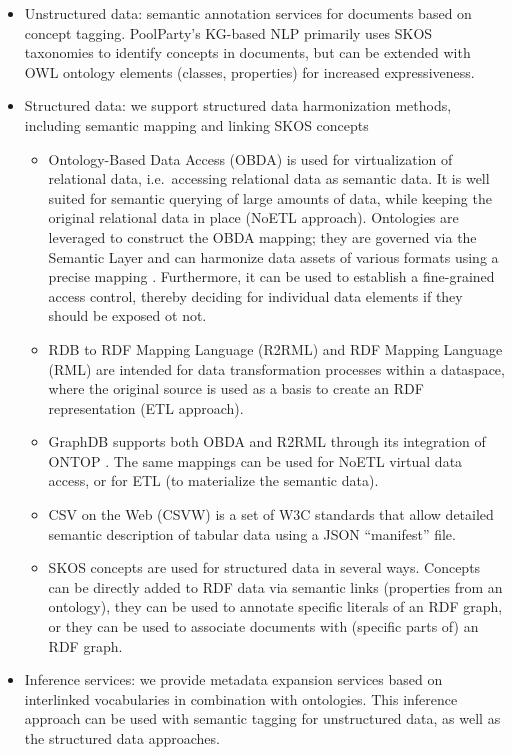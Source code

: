 \documentclass[
  super,
  preprint,
  3p]{elsarticle}
\providecommand{\tightlist}{%
  \setlength{\itemsep}{0pt}\setlength{\parskip}{0pt}}\usepackage{longtable,booktabs,array}
\begin{document}
\begin{itemize}
\tightlist
\item
  Unstructured data: semantic annotation services for documents based on
  concept tagging. PoolParty's KG-based NLP primarily uses SKOS
  taxonomies to identify concepts in documents, but can be extended with
  OWL ontology elements (classes, properties) for increased
  expressiveness.
\item
  Structured data: we support structured data harmonization methods,
  including semantic mapping and linking SKOS concepts

  \begin{itemize}
  \tightlist
  \item
    Ontology-Based Data Access (OBDA) is used for virtualization of
    relational data, i.e.~accessing relational data as semantic data. It
    is well suited for semantic querying of large amounts of data, while
    keeping the original relational data in place (NoETL approach).
    Ontologies are leveraged to construct the OBDA mapping; they are
    governed via the Semantic Layer and can harmonize data assets of
    various formats using a precise mapping
    \citep{andreselAdaptingOntologybasedData2024}. Furthermore, it can
    be used to establish a fine-grained access control, thereby deciding
    for individual data elements if they should be exposed ot not.
  \item
    RDB to RDF Mapping Language (R2RML)
    \citep{souripriyadasR2RMLRDBRDF2012} and RDF Mapping Language (RML)
    \citep{RMLIntroduction2024} are intended for data transformation
    processes within a dataspace, where the original source is used as a
    basis to create an RDF representation (ETL approach).
  \item
    GraphDB supports both OBDA and R2RML through its integration of
    ONTOP \citep{bagosiOntopFrameworkOntology2014}. The same mappings
    can be used for NoETL virtual data access, or for ETL (to
    materialize the semantic data).
  \item
    CSV on the Web (CSVW) \citep{swirrlCSVWStandards2024} is a set of
    W3C standards that allow detailed semantic description of tabular
    data using a JSON ``manifest'' file.
  \item
    SKOS concepts are used for structured data in several ways. Concepts
    can be directly added to RDF data via semantic links (properties
    from an ontology), they can be used to annotate specific literals of
    an RDF graph, or they can be used to associate documents with
    (specific parts of) an RDF graph.
  \end{itemize}
\item
  Inference services: we provide metadata expansion services based on
  interlinked vocabularies in combination with ontologies. This
  inference approach can be used with semantic tagging for unstructured
  data, as well as the structured data approaches.


\end{itemize}
\end{document}
